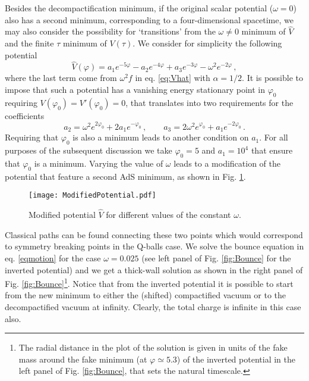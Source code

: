 \documentclass[11pt,a4paper]{article}
\begin{document}
Besides the decompactification minimum, if the original scalar  potential ($\omega=0$) also has a second minimum, corresponding to a four-dimensional spacetime, we may also consider the possibility for `transitions' from the $\omega\neq 0 $ minimum of $\hat{V}$ and the finite $\tau$ minimum of $V(\tau)$. We consider for simplicity the following potential
\begin{equation}
\hat{V}(\varphi) = a_1 e^{-5 \varphi} - a_2 e^{-4 \varphi} + a_3 e^{-3 \varphi} - \omega^2 e^{-2 \varphi} \,,
\end{equation}
where the last term come from $\omega^2 f$ in eq. \eqref{eq:Vhat} with $\alpha=1/2$. It is possible to impose that such a potential has a vanishing energy stationary point in $\varphi_0$ requiring $V(\varphi_0) = V'(\varphi_0) = 0$, that translates into two requirements for the coefficients
\begin{equation}
a_2 = \omega^2 e^{2 \varphi_0} + 2 a_1 e^{-\varphi_0}  \,, \qquad a_3 = 2 \omega^2 e^{\varphi_0} + a_1 e^{-2 \varphi_0} \,.
\end{equation}
Requiring that $\varphi_0$ is also a minimum leads to another condition on $a_1$. For all purposes of the subsequent discussion we take $\varphi_0 = 5$ and $a_1 = 10^4$ that ensure that $\varphi_0$ is a minimum. Varying the value of $\omega$ leads to a modification of the potential that feature a second AdS minimum, as shown in Fig. \ref{fig:ModifiedPotential}.
\begin{figure}
\texttt{[image: ModifiedPotential.pdf]}
\caption{Modified potential $\hat{V}$ for different values of the constant $\omega$.}
\label{fig:ModifiedPotential}
\end{figure}
Classical paths can be found connecting these two points which would correspond to symmetry breaking points in the Q-balls case. We solve the bounce equation in eq. \eqref{eqmotion} for the case $\omega = 0.025$ (see left panel of Fig. \ref{fig:Bounce} for the inverted potential) and we get a thick-wall solution as shown in the right panel of Fig. \ref{fig:Bounce}\footnote{The radial distance in the plot of the solution is given in units of the fake mass around the fake minimum (at $\varphi \simeq 5.3$) of the inverted potential in the left panel of Fig. \ref{fig:Bounce}, that sets the natural timescale.}. Notice that from the inverted potential it is possible to start from the new minimum to either the (shifted) compactified vacuum or to the decompactified vacuum at infinity. Clearly, the total charge is infinite in this case also.\\
\end{document}
